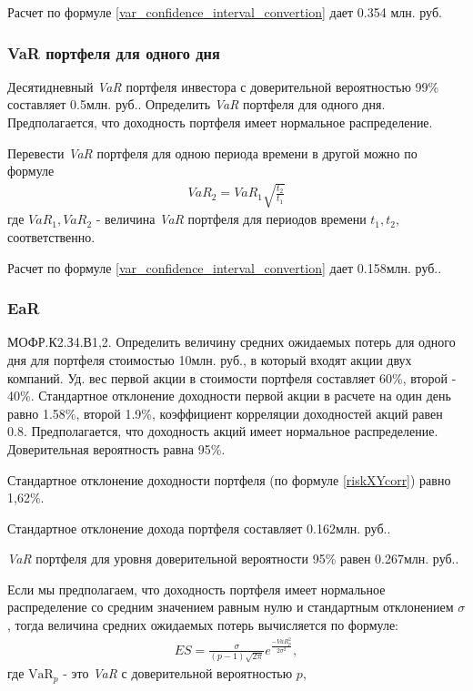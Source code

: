 \documentclass[12pt, table, a4paper,twoside]{exam}
\begin{document}
\begin{questions}
\begin{solution}[12em]
Расчет по формуле \eqref{var_confidence_interval_convertion} дает 0.354 млн. руб.
\end{solution}

\subsubsection{VaR портфеля для одного дня}
\question[10] Десятидневный \textit{VaR} портфеля инвестора с доверительной вероятностью 99\% составляет 0.5млн. руб.. Определить \textit{VaR} портфеля для одного дня. Предполагается, что доходность портфеля имеет нормальное распределение.

\begin{solution}[12em]

\raggedright
Перевести \textit{VaR }портфеля для одною периода времени в другой можно по формуле
\begin{align}
\label{var_period_convertion}
VaR_2=VaR_1\sqrt{\frac{t_2}{t_1}}
\end{align}
где
$VaR_1, VaR_2$ - величина \textit{VaR} портфеля для периодов времени $t_1,t_2$, соответственно.

Расчет по формуле \eqref{var_confidence_interval_convertion} дает 0.158млн. руб..
\end{solution}

\subsubsection{EaR}
\question[10] МОФР.К2.З4.В1,2. Определить величину средних ожидаемых потерь для одного дня для портфеля стоимостью 10млн. руб., в который входят акции двух компаний. Уд. вес первой акции в стоимости портфеля составляет 60\%, второй - 40\%. Стандартное отклонение доходности первой акции в расчете на один день равно 1.58\%, второй 1.9\%, коэффициент корреляции доходностей акций равен 0.8. Предполагается, что доходность акций имеет нормальное распределение. Доверительная вероятность равна 95\%.

\begin{solution}[12em]

\raggedright
Стандартное отклонение доходности портфеля (по формуле \eqref{riskXYcorr}) равно 1,62\%.

Стандартное отклонение дохода портфеля составляет 0.162млн. руб..

\textit{VaR} портфеля для уровня доверительной вероятности 95\% равен 0.267млн. руб..

Если мы предполагаем, что доходность портфеля имеет нормальное распределение со средним значением равным нулю и стандартным отклонением $\sigma$, тогда величина средних ожидаемых потерь вычисляется по формуле:
\begin{align}
\label{es_normal}
ES=\frac{\sigma}{(p-1)\sqrt{2\pi}}e^{\frac{-VaR_{p}^2}{2\sigma^2}},
\end{align}
где 
$\mbox{VaR}_{p}$ - это \textit{VaR} с доверительной вероятностью $p$,


\end{solution}
\end{questions}
\end{document}
